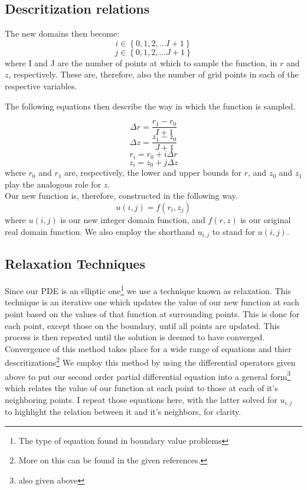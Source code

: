 \documentclass{article}
\begin{document}
\subsection{Descritization relations}

The new domains then become:
\begin{equation}
i \in \left \{ 0, 1, 2, ... I+1 \right \}
\end{equation}
\begin{equation}
j \in \left \{ 0, 1, 2, ... J+1 \right \}
\end{equation}
where I and J are the number of points at which to sample the function, in $r$
and $z$, respectively. These are, therefore, also the number of grid points in
each of the respective variables.

The following equations then describe the way in which the function is sampled.

\begin{equation}
\Delta r = \frac{r_{1}-r_{0}}{I+1}
\end{equation}
\begin{equation}
\Delta z = \frac{z_{1}-z_{0}}{J+1}
\end{equation}
\begin{equation}
r_{i} = r_{0} + i \Delta r
\end{equation}
\begin{equation}
z_{i} = z_{0} + j \Delta z
\end{equation}
where $r_0$  and $r_1$ are, respectively, the lower and upper bounds for $r$,
and $z_0$ and $z_1$ play the analogous role for $z$.\\

Our new function is, therefore, constructed in the following way.
\begin{equation}
u(i,j) = f(r_{i}, z_{j})
\end{equation}
where $u(i,j)$ is our new integer domain function, and $f(r,z)$ is our original
real domain function. We also employ the shorthand $u_{i,j}$ to stand for $u(i,j)$.

\subsection{Relaxation Techniques}
Since our PDE is an elliptic one\footnote{The type of equation found in boundary value
problems} we use a technique known as relaxation. This technique is an iterative one
which updates the value of our new function at each point based on the values of that
function at surrounding points. This is done for each point, except those on the
boundary, until all points are updated. This process is then repeated until the solution
is deemed to have converged. Convergence of this method takes place for a wide
range of equations and thier descritizations\footnote{More on this can be found
in the given references.}
We employ this method by using the differential operators given above to put
our second order partial
differential equation into a general form\footnote{also given above} which
relates the value of our function at each point to those at each of it's
neighboring points. I repeat those equations here, with the latter solved for
$u_{i,j}$ to highlight the relation between it and it's neighbors, for clarity.
\end{document}
